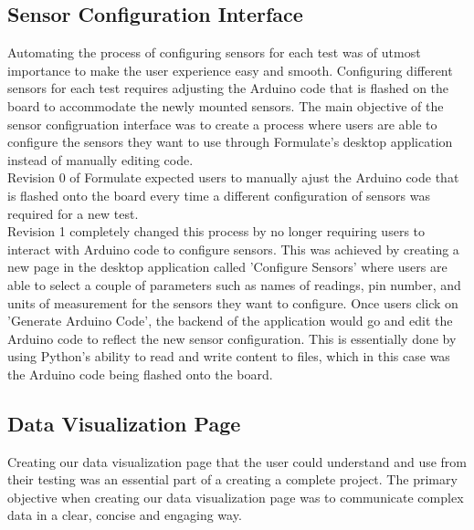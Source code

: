 \documentclass[12pt]{article}
\begin{document}
\subsection{Sensor Configuration Interface}
Automating the process of configuring sensors for each test was of utmost importance to make the user experience easy and smooth. Configuring different sensors
for each test requires adjusting the Arduino code that is flashed on the board to accommodate the newly mounted sensors. The main
objective of the sensor configruation interface was to create a process where users are able to configure the sensors they want to use through
Formulate's desktop application instead of manually editing code. \\

Revision 0 of Formulate expected users to manually ajust the Arduino code that is flashed onto the board every time a different configuration
of sensors was required for a new test. \\

Revision 1 completely changed this process by no longer requiring users to interact with Arduino code to configure sensors. This was achieved by creating a new
page in the desktop application called 'Configure Sensors' where users are able to select a couple of parameters such as names of readings, pin number, and units of
measurement for the sensors they want to configure. Once users click on 'Generate Arduino Code', the backend of the application would go and edit the Arduino
code to reflect the new sensor configuration. This is essentially done by using Python's ability to read and write content to files, which in this case was the
Arduino code being flashed onto the board.

\subsection{Data Visualization Page}

Creating our data visualization page that the user could understand and use from their testing was an essential part of a creating a complete project. The primary objective when creating our data visualization page was to communicate complex data in a clear, concise and engaging way. \\
\end{document}
